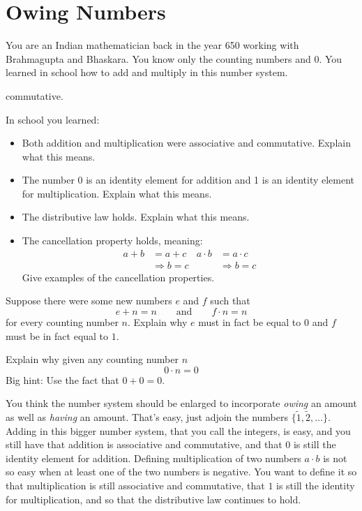 \newpage
\section{Owing Numbers}	

You are an Indian mathematician back in the year 650 working with
Brahmagupta and Bhaskara.  You know only the counting numbers and 0.
You learned in school how to add and multiply in this number system.

commutative. 

\begin{prob}
In school you learned:
\begin{itemize}
\item Both addition and multiplication were
associative and commutative. Explain what this means.
\item The number $0$ is an identity element for addition and 1 is an
identity element for multiplication. Explain what this means.
\item The distributive law holds.  Explain what this means.
\item The cancellation property holds, meaning:
\begin{align*}
a + b &= a + c  & a \cdot b &= a \cdot c\\
&\Rightarrow b = c & &\Rightarrow{b = c}
\end{align*}
Give examples of the cancellation properties. 
\end{itemize}
\end{prob}

\begin{prob}
Suppose there were some new numbers $e$ and $f$ such that
\[
e+ n = n\qquad\text{and}\qquad f\cdot n = n
\]
for every counting number $n$. Explain why $e$ must in fact be equal to
$0$ and $f$ must be in fact equal to $1$.
\end{prob}


\begin{prob}
Explain why given any counting number  $n$
\[
0 \cdot n = 0
\]
Big hint: Use the fact that $0 + 0 = 0$.
\end{prob}

You think the number system should be enlarged to
incorporate \textit{owing} an amount as well as \textit{having} an
amount. That's easy, just adjoin the numbers
$\{\tilde{1}, \tilde{2},\dots\}$.  Adding in this bigger number
system, that you call the integers, is easy, and you still have that
addition is associative and commutative, and that $0$ is still the
identity element for addition.  Defining multiplication of two numbers
$a\cdot b$ is not so easy when at least one of the two numbers is
negative.  You want to define it so that multiplication is still
associative and commutative, that $1$ is still the identity for
multiplication, and so that the distributive law continues to hold.


